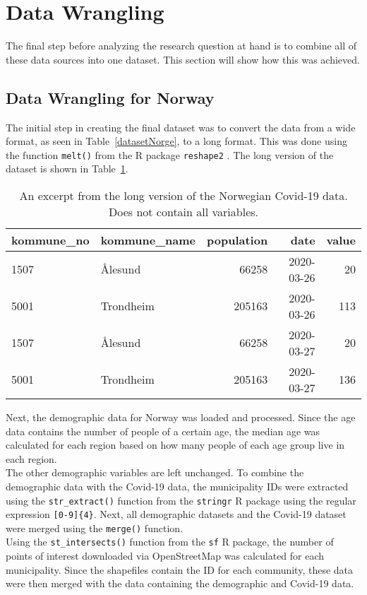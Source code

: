 \section{Data Wrangling}
The final step before analyzing the research question at hand is to combine all of these data sources into one dataset. This section will show how this was achieved.
\subsection{Data Wrangling for Norway}
The initial step in creating the final dataset was to convert the data from a wide format, as seen in Table~\ref{datasetNorge}, to a long format. This was done using the function \texttt{melt()} from the R package \texttt{reshape2} \cite{reshape2}. The long version of the dataset is shown in Table~\ref{norwayLong}.
\begin{table}[H] 
\caption{An excerpt from the long version of the Norwegian Covid-19 data. Does not contain all variables.\label{norwayLong}}
\begin{tabular}{l l r r r}
\toprule
\textbf{kommune\_no}	& \textbf{kommune\_name}	& \textbf{population} & \textbf{date} & \textbf{value}\\
\midrule
1507 & Ålesund & 66258 & 2020-03-26 & 20\\
5001 & Trondheim  & 205163  & 2020-03-26 & 113\\
1507 & Ålesund & 66258 & 2020-03-27 & 20\\
5001 & Trondheim  & 205163  & 2020-03-27 & 136\\
\bottomrule
\end{tabular}
\end{table}
Next, the demographic data for Norway was loaded and processed. Since the age data contains the number of people of a certain age, the median age was calculated for each region based on how many people of each age group live in each region. \\
The other demographic variables are left unchanged. To combine the demographic data with the Covid-19 data, the municipality IDs were extracted using the \texttt{str\_extract()} function from the \texttt{stringr} \cite{stringr} R package using the regular expression \texttt{[0-9]\{4\}}. Next, all demographic datasets and the Covid-19 dataset were merged using the \texttt{merge()} function. \\
Using the \texttt{st\_intersects()} function from the \texttt{sf} \cite{sf} R package, the number of points of interest downloaded via OpenStreetMap was calculated for each municipality. Since the shapefiles contain the ID for each community, these data were then merged with the data containing the demographic and Covid-19 data. \\
